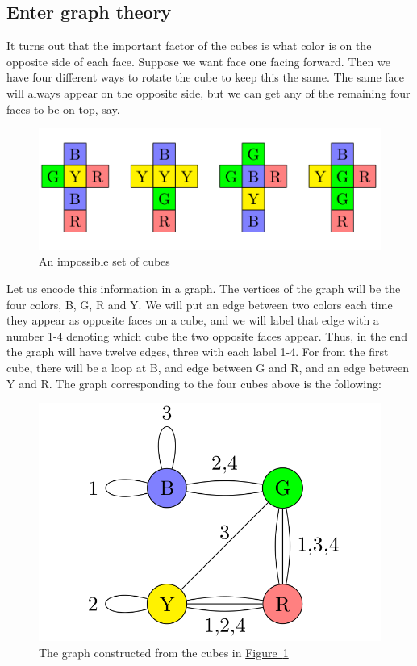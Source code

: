 \documentclass[10pt,]{book}
\theoremstyle{plain}
\theoremstyle{definition}
\theoremstyle{definition}
\theoremstyle{definition}
\theoremstyle{definition}
\numberwithin{equation}{section}
\begin{document}
\subsection[{Enter graph theory}]{Enter graph theory}\label{subsection-11}
\hypertarget{p-60}{}%
It turns out that the important factor of the cubes is what color is on the opposite side of each face.  Suppose we want face one facing forward.  Then we have four different ways to rotate the cube to keep this the same.  The same face will always appear on the opposite side, but we can get any of the remaining four faces to be on top, say.%
\begin{figure}
\centering
\includegraphics[width=1\linewidth]{images/ImpossibleCubes.png}
\caption{An impossible set of cubes\label{fig_impossible_cubes}}
\end{figure}
\hypertarget{p-61}{}%
Let us encode this information in a graph.   The vertices of the graph will be the four colors, B, G, R and Y. We will put an edge between two colors each time they appear as opposite faces on a cube, and we will label that edge with a number 1-4 denoting which cube the two opposite faces appear. Thus, in the end the graph will have twelve edges, three with each label 1-4. For from the first cube, there will be a loop at B, and edge between G and R, and an edge between Y and R.  The graph corresponding to the four cubes above is the following:%
\begin{figure}
\centering
\includegraphics[width=0.9\linewidth]{images/InstantInsanityImpossibleGraph.png}
\caption{The graph constructed from the cubes in \hyperref[fig_impossible_cubes]{Figure~\ref{fig_impossible_cubes}}\label{fig_graph_from_cubes}}
\end{figure}
\typeout{************************************************}
\typeout{************************************************}
\end{document}
